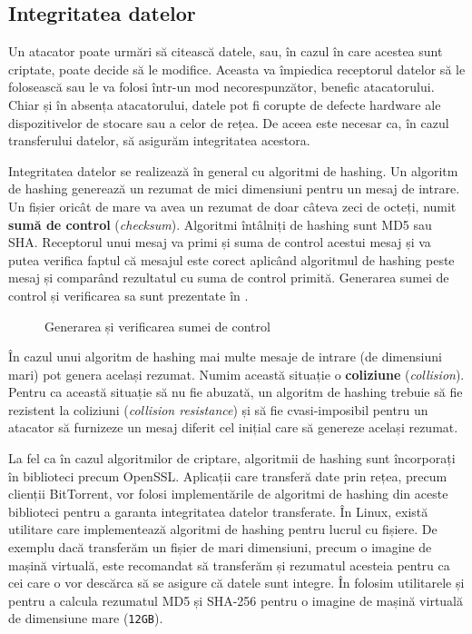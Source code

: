 \subsection{Integritatea datelor}
\label{sec:sec:data:integrity}

Un atacator poate urmări să citească datele, sau, în cazul în care acestea sunt criptate, poate decide să le modifice.
Aceasta va împiedica receptorul datelor să le folosească sau le va folosi într-un mod necorespunzător, benefic atacatorului.
Chiar și în absența atacatorului, datele pot fi corupte de defecte hardware ale dispozitivelor de stocare sau a celor de rețea.
De aceea este necesar ca, în cazul transferului datelor, să asigurăm integritatea acestora.

Integritatea datelor se realizează în general cu algoritmi de hashing.
Un algoritm de hashing generează un rezumat de mici dimensiuni pentru un mesaj de intrare.
Un fișier oricât de mare va avea un rezumat de doar câteva zeci de octeți, numit \textbf{sumă de control} (\textit{checksum}).
Algoritmi întâlniți de hashing sunt MD5 sau SHA.
Receptorul unui mesaj va primi și suma de control acestui mesaj și va putea verifica faptul că mesajul este corect aplicând algoritmul de hashing peste mesaj și comparând rezultatul cu suma de control primită.
Generarea sumei de control și verificarea sa sunt prezentate în .

\begin{figure}[htbp]
  \centering
  \def\svgwidth{\columnwidth}
  
  \caption{Generarea și verificarea sumei de control}
  \label{fig:sec:checksum}
\end{figure}

În cazul unui algoritm de hashing mai multe mesaje de intrare (de dimensiuni mari) pot genera același rezumat.
Numim această situație o \textbf{coliziune} (\textit{collision}).
Pentru ca această situație să nu fie abuzată, un algoritm de hashing trebuie să fie rezistent la coliziuni (\textit{collision resistance}) și să fie cvasi-imposibil pentru un atacator să furnizeze un mesaj diferit cel inițial care să genereze același rezumat.

La fel ca în cazul algoritmilor de criptare, algoritmii de hashing sunt încorporați în biblioteci precum OpenSSL.
Aplicații care transferă date prin rețea, precum clienții BitTorrent, vor folosi implementările de algoritmi de hashing din aceste biblioteci pentru a garanta integritatea datelor transferate.
În Linux, există utilitare care implementează algoritmi de hashing pentru lucrul cu fișiere.
De exemplu dacă transferăm un fișier de mari dimensiuni, precum o imagine de mașină virtuală, este recomandat să transferăm și rezumatul acesteia pentru ca cei care o vor descărca să se asigure că datele sunt integre.
În  folosim utilitarele  și  pentru a calcula rezumatul MD5 și SHA-256 pentru o imagine de mașină virtuală de dimensiune mare (\texttt{12GB}).

